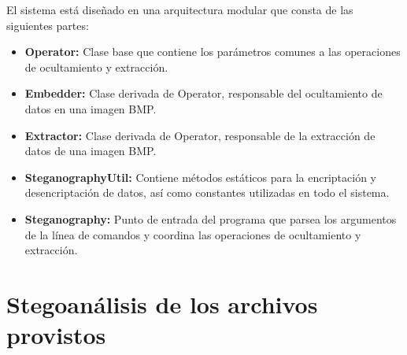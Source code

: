 \documentclass[a4paper,12pt]{article}
\begin{document}
	El sistema está diseñado en una arquitectura modular que consta de las siguientes partes:
	
	\begin{itemize}
		\item \textbf{Operator:} Clase base que contiene los parámetros comunes a las operaciones de ocultamiento y extracción.
		\item \textbf{Embedder:} Clase derivada de Operator, responsable del ocultamiento de datos en una imagen BMP.
		\item \textbf{Extractor:} Clase derivada de Operator, responsable de la extracción de datos de una imagen BMP.
		\item \textbf{SteganographyUtil:} Contiene métodos estáticos para la encriptación y desencriptación de datos, así como constantes utilizadas en todo el sistema.
		\item \textbf{Steganography:} Punto de entrada del programa que parsea los argumentos de la línea de comandos y coordina las operaciones de ocultamiento y extracción.
	\end{itemize}

	\newpage

	\section{Stegoanálisis de los archivos provistos}
	
\end{document}
